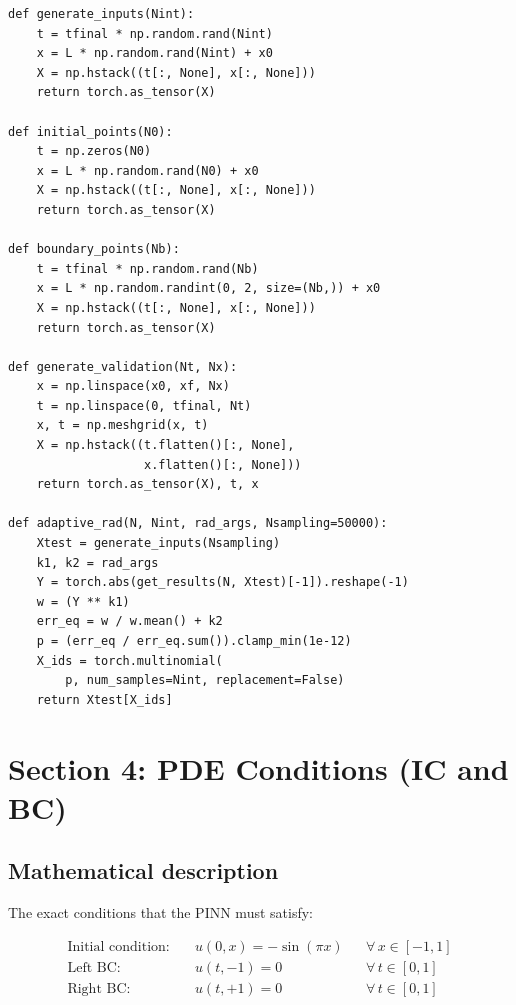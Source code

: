 \documentclass[11pt,a4paper]{article}
\begin{document}
\begin{lstlisting}
def generate_inputs(Nint):
    t = tfinal * np.random.rand(Nint)
    x = L * np.random.rand(Nint) + x0
    X = np.hstack((t[:, None], x[:, None]))
    return torch.as_tensor(X)

def initial_points(N0):
    t = np.zeros(N0)
    x = L * np.random.rand(N0) + x0
    X = np.hstack((t[:, None], x[:, None]))
    return torch.as_tensor(X)

def boundary_points(Nb):
    t = tfinal * np.random.rand(Nb)
    x = L * np.random.randint(0, 2, size=(Nb,)) + x0
    X = np.hstack((t[:, None], x[:, None]))
    return torch.as_tensor(X)

def generate_validation(Nt, Nx):
    x = np.linspace(x0, xf, Nx)
    t = np.linspace(0, tfinal, Nt)
    x, t = np.meshgrid(x, t)
    X = np.hstack((t.flatten()[:, None],
                   x.flatten()[:, None]))
    return torch.as_tensor(X), t, x

def adaptive_rad(N, Nint, rad_args, Nsampling=50000):
    Xtest = generate_inputs(Nsampling)
    k1, k2 = rad_args
    Y = torch.abs(get_results(N, Xtest)[-1]).reshape(-1)
    w = (Y ** k1)
    err_eq = w / w.mean() + k2
    p = (err_eq / err_eq.sum()).clamp_min(1e-12)
    X_ids = torch.multinomial(
        p, num_samples=Nint, replacement=False)
    return Xtest[X_ids]
\end{lstlisting}


\section{Section 4: PDE Conditions (IC and BC)}
\label{sec:conditions}

\subsection*{Mathematical description}

The exact conditions that the PINN must satisfy:

\begin{align}
  \text{Initial condition:}\quad & u(0, x) = -\sin(\pi x)
    && \forall\, x \in [-1,1] \label{eq:ic2}\\
  \text{Left BC:}\quad           & u(t, -1) = 0
    && \forall\, t \in [0,1] \label{eq:bcl}\\
  \text{Right BC:}\quad          & u(t, +1) = 0
    && \forall\, t \in [0,1] \label{eq:bcr}
\end{align}
\end{document}
